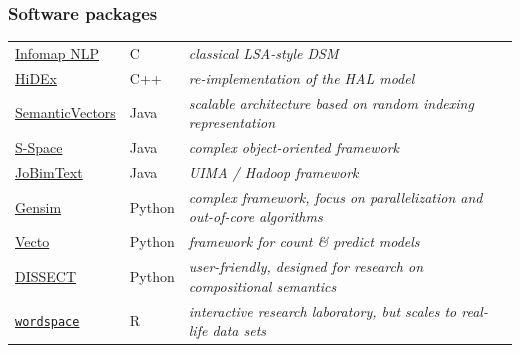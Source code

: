 \documentclass[t]{beamer} %
\begin{document}
\begin{frame}
  \frametitle{Software packages}

  \begin{tabular}{>{\color{secondary}}ll>{\itshape}p{6cm}}
    \href{http://infomap-nlp.sourceforge.net/}{Infomap NLP} & C & classical LSA-style DSM \\
    \href{http://www.psych.ualberta.ca/~westburylab/downloads/HiDEx.download.html}{HiDEx} & C++ & re-implementation of the HAL model \citep{Lund:Burgess:96} \\
    \href{http://code.google.com/p/semanticvectors/}{SemanticVectors} & Java & scalable architecture based on random indexing representation \\
    \href{http://github.com/fozziethebeat/S-Space}{S-Space} & Java & complex object-oriented framework \\
    \href{http://ltmaggie.informatik.uni-hamburg.de/jobimtext/}{JoBimText} & Java & UIMA / Hadoop framework \\
    \href{http://radimrehurek.com/gensim/}{Gensim} & Python & complex framework, focus on parallelization and out-of-core algorithms \\
    \href{http://vecto.space/}{Vecto} & Python & framework for count \& predict models \\
    \href{http://clic.cimec.unitn.it/composes/toolkit/}{DISSECT} & Python & user-friendly, designed for research on compositional semantics \\
    \href{http://wordspace.r-forge.r-project.org/}{\color{primary}\texttt{wordspace}} & R & interactive research laboratory, but scales to real-life data sets
  \end{tabular}

  \gap[0.5]
  \hfill{}
\end{frame}
\end{document}

